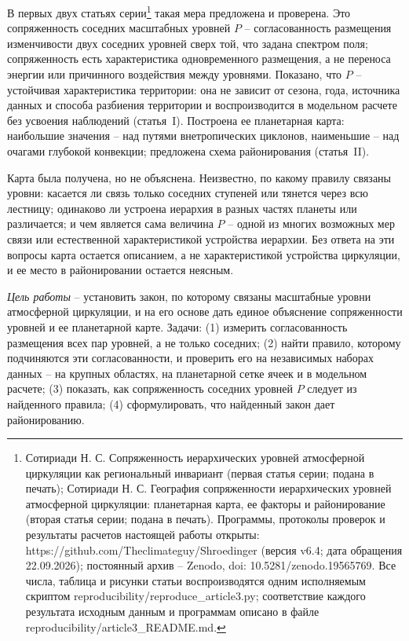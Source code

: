 \documentclass[12pt,a4paper]{article}
\begin{document}
В первых двух статьях серии\footnote{Сотириади Н. С. Сопряженность иерархических уровней атмосферной циркуляции как региональный инвариант (первая статья серии; подана в печать); Сотириади Н. С. География сопряженности иерархических уровней атмосферной циркуляции: планетарная карта, ее факторы и районирование (вторая статья серии; подана в печать). Программы, протоколы проверок и результаты расчетов настоящей работы открыты: https://github.com/Theclimateguy/Shroedinger (версия v6.4; дата обращения 22.09.2026); постоянный архив -- Zenodo, doi: 10.5281/zenodo.19565769. Все числа, таблица и рисунки статьи воспроизводятся одним исполняемым скриптом reproducibility/reproduce\_article3.py; соответствие каждого результата исходным данным и программам описано в файле reproducibility/article3\_README.md.} такая мера предложена и проверена. Это сопряженность соседних масштабных уровней $P$ -- согласованность размещения изменчивости двух соседних уровней сверх той, что задана спектром поля; сопряженность есть характеристика одновременного размещения, а не переноса энергии или причинного воздействия между уровнями. Показано, что $P$ -- устойчивая характеристика территории: она не зависит от сезона, года, источника данных и способа разбиения территории и воспроизводится в модельном расчете без усвоения наблюдений (статья~I). Построена ее планетарная карта: наибольшие значения -- над путями внетропических циклонов, наименьшие -- над очагами глубокой конвекции; предложена схема районирования (статья~II).

Карта была получена, но не объяснена. Неизвестно, по какому правилу связаны уровни: касается ли связь только соседних ступеней или тянется через всю лестницу; одинаково ли устроена иерархия в разных частях планеты или различается; и чем является сама величина $P$ -- одной из многих возможных мер связи или естественной характеристикой устройства иерархии. Без ответа на эти вопросы карта остается описанием, а не характеристикой устройства циркуляции, и ее место в районировании остается неясным.

\emph{Цель работы} -- установить закон, по которому связаны масштабные уровни атмосферной циркуляции, и на его основе дать единое объяснение сопряженности уровней и ее планетарной карте. Задачи: (1) измерить согласованность размещения всех пар уровней, а не только соседних; (2) найти правило, которому подчиняются эти согласованности, и проверить его на независимых наборах данных -- на крупных областях, на планетарной сетке ячеек и в модельном расчете; (3) показать, как сопряженность соседних уровней $P$ следует из найденного правила; (4) сформулировать, что найденный закон дает районированию.
\end{document}
